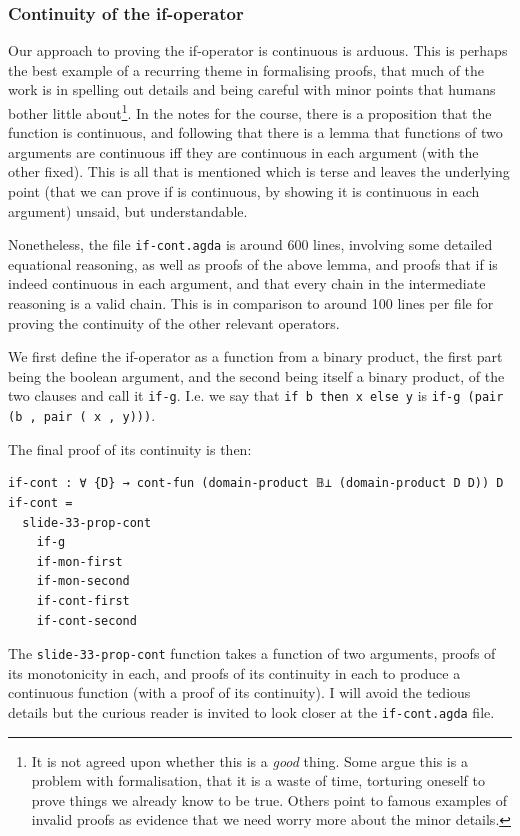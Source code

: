 \documentclass[12pt,a4paper,twoside,openright]{report}
\begin{document}
\subsubsection{Continuity of the if-operator}
Our approach to proving the if-operator is continuous is arduous. This is perhaps the best example of a recurring theme \cite{PLFA} \cite{Dima-Soas} \cite{Ted} in formalising proofs, that much of the work is in spelling out details and being careful with minor points that humans bother little about\footnote{It is not agreed upon whether this is a \textit{good} thing. Some argue this is a problem with formalisation, that it is a waste of time, torturing oneself to prove things we already know to be true. Others point to famous examples of invalid proofs as evidence that we need worry more about the minor details.}. In the notes for the course, there is a proposition that the function is continuous, and following that there is a lemma that functions of two arguments are continuous iff they are continuous in each argument (with the other fixed). This is all that is mentioned which is terse and leaves the underlying point (that we can prove if is continuous, by showing it is continuous in each argument) unsaid, but understandable.

Nonetheless, the file \texttt{if-cont.agda} is around 600 lines, involving some detailed equational reasoning, as well as proofs of the above lemma, and proofs that if is indeed continuous in each argument, and that every chain in the intermediate reasoning is a valid chain. This is in comparison to around 100 lines per file for proving the continuity of the other relevant operators. 

We first define the if-operator as a function from a binary product, the first part being the boolean argument, and the second being itself a binary product, of the two clauses and call it \texttt{if-g}. I.e. we say that \texttt{if b then x else y} is \texttt{if-g (pair (b , pair ( x , y)))}. 

The final proof of its continuity is then:
\begin{verbatim}
if-cont : ∀ {D} → cont-fun (domain-product 𝔹⊥ (domain-product D D)) D
if-cont =
  slide-33-prop-cont
    if-g
    if-mon-first 
    if-mon-second
    if-cont-first
    if-cont-second
\end{verbatim}
The \texttt{slide-33-prop-cont} function takes a function of two arguments, proofs of its monotonicity in each, and proofs of its continuity in each to produce a continuous function (with a proof of its continuity). I will avoid the tedious details but the curious reader is invited to look closer at the \texttt{if-cont.agda} file.
\end{document}
